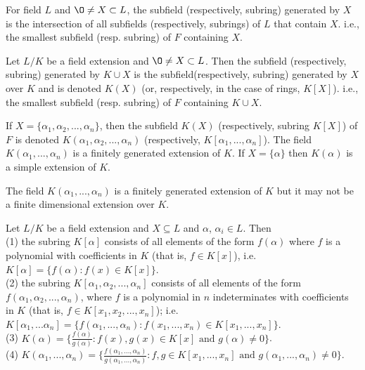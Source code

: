 \begin{definition}{}{}
    For field $L$ and $\O\neq X\subset L$, the subfield (respectively, subring) generated by $X$
    is the intersection of all subfields (respectively, subrings) of $L$ that contain $X$.  
    i.e., the smallest subfield (resp. subring) of
    $F$ containing $X$.
\end{definition}

\begin{definition}{}{}
    Let $L/K$ be a field extension and $\O\neq X\subset L$. Then the subfield (respectively, subring)
    generated by $K\cup X$ is the subfield(respectively, subring) generated by $X$ over $K$ and is denoted $K(X)$ 
    (or, respectively, in the case of rings, $K[X]$).
    i.e., the smallest subfield (resp. subring) of $F$ containing $K\cup X$.
\end{definition}

\begin{definition}{}{}
    If $X=\{\alpha_1,\alpha_2,...,\alpha_n\}$, then the subfield $K(X)$ (respectively, subring $K[X]$)
    of $F$ is denoted $K(\alpha_1,\alpha_2,...,\alpha_n)$ (respectively, $K[\alpha_1,...,\alpha_n]$). 
    The field $K(\alpha_1,...,\alpha_n)$
    is a finitely generated extension of $K$. If $X=\{\alpha\}$ then $K(\alpha)$ is a simple extension of $K$.
\end{definition}

\begin{remark}
    The field $K(\alpha_1,...,\alpha_n)$ is a finitely generated extension of $K$ but it may not be a finite dimensional extension over $K$.
\end{remark}

\begin{theorem}{}{}
    Let $L/K$ be a field extension and $X\subseteq L$ and $\alpha$, $\alpha_i\in L$. Then\\
    (1) the subring $K[\alpha]$ consists of all elements of the form $f(\alpha)$ where $f$ is a polynomial with coefficients in $K$ (that is, $f\in K[x]$), i.e. 
    $K[\alpha]=\{f(\alpha):f(x)\in K[x]\}$. \\
    (2) the subring $K[\alpha_1, \alpha_2, . . . , \alpha_n]$ consists of all elements of the form $f(\alpha_1, \alpha_2, . . . , \alpha_n)$,
    where $f$ is a polynomial in $n$ indeterminates with coefficients in $K$ (that is,
    $f \in K[x_1, x_2, . . . , x_n]$); i.e. 
    $K[\alpha_1,...\alpha_n]=\{f(\alpha_1,...,\alpha_n):f(x_1,...,x_n)\in K[x_1,...,x_n]\}$. \\
    (3) $K(\alpha)=\{\frac{f(\alpha)}{g(\alpha)}:f(x),g(x)\in K[x] \text{ and } g(\alpha)\neq 0\}$. \\
    (4) $K(\alpha_1,...,\alpha_n)=\{\frac{f(\alpha_1,...,\alpha_n)}{g(\alpha_1,...,\alpha_n)}:f,g\in K[x_1,...,x_n]\text{ and } g(\alpha_1,...,\alpha_n)\neq 0\}$.
\end{theorem}

